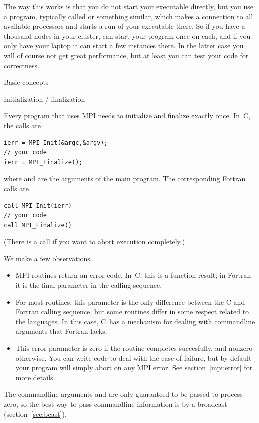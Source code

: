 The way this works is that you do not start your executable directly,
but you use a program, typically called  or
something similar, which makes a connection to all available
processors and starts a run of your executable there. So if you have a
thousand nodes in your cluster,  can start your program once
on each, and if you only have your laptop it can start a few instances
there. In the latter case you will of course not get great
performance, but at least you can test your code for correctness.

 {Basic concepts}

 {Initialization / finalization}

Every program that uses MPI needs to initialize and finalize exactly
once. In~C, the calls are
\begin{verbatim}
ierr = MPI_Init(&argc,&argv);
// your code
ierr = MPI_Finalize();
\end{verbatim}
where  and  are the arguments of the main program.
%
The corresponding Fortran calls are
\begin{verbatim}
call MPI_Init(ierr)
// your code
call MPI_Finalize()
\end{verbatim}
(There is a call  if you want to abort execution
completely.)

We make a few observations.
\begin{itemize}
\item MPI routines return an error code. In~C, this is a function
  result; in Fortran it is the final parameter in the calling
  sequence.
\item For most routines, this parameter is the only difference between
  the C and Fortran calling sequence, but some routines differ in some
  respect related to the languages. In this case, C~has a mechanism
  for dealing with commandline arguments that Fortran lacks.
\item This error parameter is zero if the routine completes
  succesfully, and nonzero otherwise. You can write code to deal with
  the case of failure, but by default your program will simply abort
  on any MPI error. See section~\ref{mpi:error} for more details.
\end{itemize}

The commandline arguments  and  are only guaranteed to
be passed to process zero, so the best way to pass commandline information
is by a broadcast (section~\ref{sec:bcast}).

